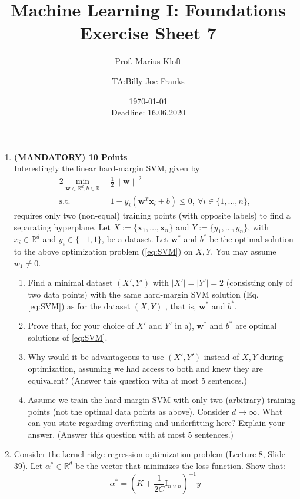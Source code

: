\documentclass[]{scrartcl}
\author{Prof. Marius Kloft \and TA:Billy Joe Franks}
\title{Machine Learning I: Foundations \\ Exercise Sheet 7}
\date{\today\\Deadline: 16.06.2020}
\newcommand{\R}{\mathbb{R}}
\newcommand{\bx}{\mathbf{x}}
\newcommand{\bw}{\mathbf{w}}
\begin{document}
\maketitle

\begin{enumerate}

\item \textbf{(MANDATORY) 10 Points}\\ Interestingly the linear hard-margin SVM, given by 
\begin{alignat}{2}
	\label{eq:SVM}
   \min_{\bw \in \R^d, b \in \R}~&  \frac{1}{2}\left\lVert\bw\right\rVert^2\\
   \text{s.t.}~  & 1-y_i(\bw^T\bx_i+b) \leq 0,~\forall i\in\{1,\dots,n\}\nonumber,
\end{alignat}
requires only two (non-equal) training points (with opposite labels) to find a separating hyperplane. 
Let $X:=\{\bx_1, \dots, \bx_n\}$ and $Y:=\{y_1, \dots, y_n\}$, with $x_i \in \R^d$ and $y_i \in \{-1, 1\}$, be a dataset. Let $\bw^*$ and $b^*$ be the optimal solution to the above optimization problem (\ref{eq:SVM}) on $X, Y$. You may assume $w_1\neq0$.
\begin{enumerate}
\item Find a minimal dataset $(X',Y')$ with $|X'|=|Y'|=2$ (consisting only of two data points) with the same hard-margin SVM solution (Eq. \eqref{eq:SVM}) as for the dataset $(X, Y)$ , that is, $\bw^*$ and $b^*$.
\item Prove that, for your choice of $X'$ and $Y'$ in a), $\bw^*$ and $b^*$ are optimal solutions of \eqref{eq:SVM}.
\item Why would it be advantageous to use $(X', Y')$ instead of $X, Y$ during optimization, assuming we had access to both and knew they are equivalent? (Answer this question with at most 5 sentences.)
\item Assume we train the hard-margin SVM with only two (arbitrary) training points (not the optimal data points as above). Consider $d \to \infty$. What can you state regarding overfitting and underfitting here? Explain your answer. (Answer this question with at most 5 sentences.)
\end{enumerate}

\item Consider the kernel ridge regression optimization problem (Lecture 8, Slide 39). Let $\alpha^* \in \R^d$ be the vector that minimizes the loss function. Show that:
$$\alpha^* = \left(K+\frac{1}{2C}\text{I}_{n\times n}\right)^{-1}y$$


\end{enumerate}
\end{document}

